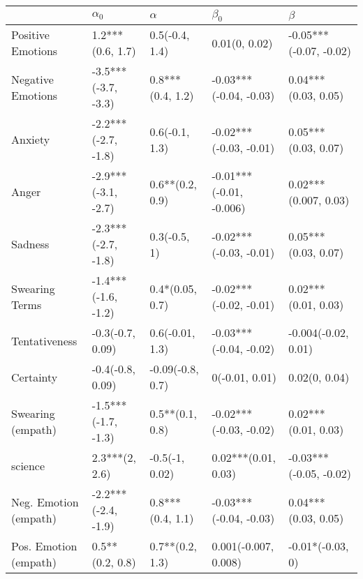 \begin{tabular}{lllll}
\toprule
{} &           $\alpha_0$ &          $\alpha$ &                $\beta_0$ &                 $\beta$ \\
\midrule
Positive Emotions     &     1.2***(0.6, 1.7) &    0.5(-0.4, 1.4) &            0.01(0, 0.02) &  -0.05***(-0.07, -0.02) \\
Negative Emotions     &  -3.5***(-3.7, -3.3) &  0.8***(0.4, 1.2) &   -0.03***(-0.04, -0.03) &     0.04***(0.03, 0.05) \\
Anxiety               &  -2.2***(-2.7, -1.8) &    0.6(-0.1, 1.3) &   -0.02***(-0.03, -0.01) &     0.05***(0.03, 0.07) \\
Anger                 &  -2.9***(-3.1, -2.7) &   0.6**(0.2, 0.9) &  -0.01***(-0.01, -0.006) &    0.02***(0.007, 0.03) \\
Sadness               &  -2.3***(-2.7, -1.8) &      0.3(-0.5, 1) &   -0.02***(-0.03, -0.01) &     0.05***(0.03, 0.07) \\
Swearing Terms        &  -1.4***(-1.6, -1.2) &   0.4*(0.05, 0.7) &   -0.02***(-0.02, -0.01) &     0.02***(0.01, 0.03) \\
Tentativeness         &     -0.3(-0.7, 0.09) &   0.6(-0.01, 1.3) &   -0.03***(-0.04, -0.02) &     -0.004(-0.02, 0.01) \\
Certainty             &     -0.4(-0.8, 0.09) &  -0.09(-0.8, 0.7) &           0(-0.01, 0.01) &           0.02(0, 0.04) \\
Swearing (empath)     &  -1.5***(-1.7, -1.3) &   0.5**(0.1, 0.8) &   -0.02***(-0.03, -0.02) &     0.02***(0.01, 0.03) \\
science               &       2.3***(2, 2.6) &    -0.5(-1, 0.02) &      0.02***(0.01, 0.03) &  -0.03***(-0.05, -0.02) \\
Neg. Emotion (empath) &  -2.2***(-2.4, -1.9) &  0.8***(0.4, 1.1) &   -0.03***(-0.04, -0.03) &     0.04***(0.03, 0.05) \\
Pos. Emotion (empath) &      0.5**(0.2, 0.8) &   0.7**(0.2, 1.3) &     0.001(-0.007, 0.008) &        -0.01*(-0.03, 0) \\
\bottomrule
\end{tabular}
